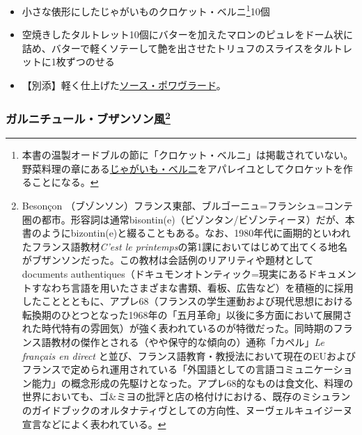 \begin{recette}
\begin{itemize}
\item
  小さな俵形にしたじゃがいものクロケット・ベルニ\footnote{本書の温製オードブルの節に「クロケット・ベルニ」は掲載されていない。野菜料理の章にある\protect\hyperlink{pommes-de-terre-berny}{じゃがいも・ベルニ}をアパレイユとしてクロケットを作ることになる。}10個
\item
  空焼きしたタルトレット10個にバターを加えたマロンのピュレをドーム状に詰め、バターで軽くソテーして艶を出させたトリュフのスライスをタルトレットに1枚ずつのせる
\item
  【別添】軽く仕上げた\protect\hyperlink{sauce-poivrade}{ソース・ポワヴラード}。
\end{itemize}

\atoaki{}

\hypertarget{garniture-bizontine}{%
\subsubsection[ガルニチュール・ブザンソン風]{\texorpdfstring{ガルニチュール・ブザンソン風\footnote{Besonçon
  （ブゾンソン）フランス東部、ブルゴーニュ=フランシュ=コンテ圏の都市。形容詞は通常bisontin(e)（ビゾンタン/ビゾンティーヌ）だが、本書のようにbizontin(e)と綴ることもある。なお、1980年代に画期的といわれたフランス語教材\emph{C'est
  le
  printemps}の第1課においてはじめて出てくる地名がブザンソンだった。この教材は会話例のリアリティや題材としてdocuments
  authentiques（ドキュモンオトンティック=現実にあるドキュメントすなわち言語を用いたさまざまな書類、看板、広告など）を積極的に採用したこととともに、アプレ68（フランスの学生運動および現代思想における転換期のひとつとなった1968年の「五月革命」以後に多方面において展開された時代特有の雰囲気）が強く表われているのが特徴だった。同時期のフランス語教材の傑作とされる（やや保守的な傾向の）通称「カペル」\emph{Le
  français en direct}
  と並び、フランス語教育・教授法において現在のEUおよびフランスで定められ運用されている「外国語としての言語コミュニケーション能力」の概念形成の先駆けとなった。アプレ68的なものは食文化、料理の世界においても、ゴ\&ミヨの批評と店の格付けにおける、既存のミシュランのガイドブックのオルタナティヴとしての方向性、ヌーヴェルキュイジーヌ宣言などによく表われている。}}{ガルニチュール・ブザンソン風}}\label{garniture-bizontine}}




\end{recette}
